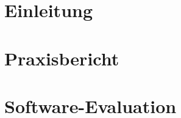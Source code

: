 



\cleardoublepage %

\pagestyle{scrheadings} %

\cleardoublepage %


\cleardoublepage %


\part{Einleitung}




\cleardoublepage %


\part{Praxisbericht}





\part{Software-Evaluation}

